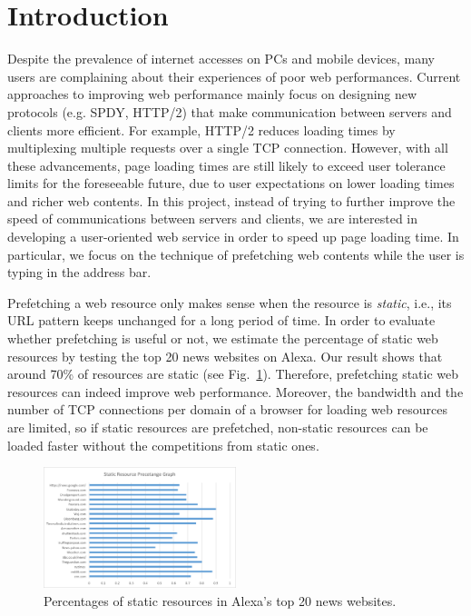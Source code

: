 \section{Introduction}
\label{sec:intro}

Despite the prevalence of internet accesses on PCs and mobile devices, many users are complaining about their experiences of poor web performances. Current approaches to improving web performance mainly focus on designing new protocols (e.g. SPDY, HTTP/2) that make communication between servers and clients more efficient. For example, HTTP/2 reduces loading times by multiplexing multiple requests over a single TCP connection. However, with all these advancements, page loading times are still likely to exceed user tolerance limits for the foreseeable future, due to user expectations on lower loading times and richer web contents. In this project, instead of trying to further improve the speed of communications between servers and clients, we are interested in developing a user-oriented web service in order to speed up page loading time. In particular, we focus on the technique of prefetching web contents while the user is typing in the address bar.

Prefetching a web resource only makes sense when the resource is \emph{static}, i.e., its URL pattern keeps unchanged for a long period of time. In order to evaluate whether prefetching is useful or not, we estimate the percentage of static web resources by testing the top 20 news websites on Alexa. Our result shows that around 70\% of resources are static (see Fig.~\ref{fig:static_resource_precentage}). Therefore, prefetching static web resources can indeed improve web performance. Moreover, the bandwidth and the number of TCP connections per domain of a browser for loading web resources are limited, so if static resources are prefetched, non-static resources can be loaded faster without the competitions from static ones.

\begin{figure}[htbp] 
	\centering
	\includegraphics[width=0.5\textwidth]{static_resource_precentage.png}  
	\caption{Percentages of static resources in Alexa's top 20 news websites.}
	\label{fig:static_resource_precentage}
\end{figure} 

